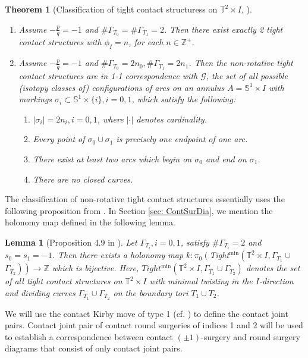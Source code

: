 \documentclass{amsart}
\theoremstyle{plain}
\newtheorem{thm}{Theorem}
\newtheorem{lem}{Lemma}
\theoremstyle{remark}
\theoremstyle{definition}
\newcommand{\s}{\mathbb{S}}
\begin{document}
\begin{thm}[Classification of tight contact structuress on $\mathbb{T}^2 \times I$, \cite{KH}]
\begin{enumerate}
\item Assume $-\frac{p}{q}=-1$ and $\# \Gamma_{T_0}=\# \Gamma_{T_1}=2$. Then there exist exactly 2 tight contact structures with $\phi_I=n$, for each $n \in \mathbb{Z}^{+}$.
    \item Assume $-\frac{p}{q}=-1$ and $\# \Gamma_{T_0}=2 n_0, \# \Gamma_{T_1}=2 n_1$. Then the non-rotative tight contact structures are in 1-1 correspondence with $\mathcal{G}$, the set of all possible (isotopy classes of) configurations of arcs on an annulus $A= \s^1 \times I$ with markings $\sigma_i \subset \s^1 \times\{i\}, i=0,1$, which satisfy the following:
    \begin{enumerate}
        \item  $\left|\sigma_i\right|=2 n_i, i=0,1$, where $|\cdot|$ denotes cardinality.
        \item  Every point of $\sigma_0 \cup \sigma_1$ is precisely one endpoint of one arc.
        \item There exist at least two arcs which begin on $\sigma_0$ and end on $\sigma_1$.
        \item There are no closed curves.
    \end{enumerate}
\end{enumerate}
\end{thm}

The classification of non-rotative tight contact structures essentially uses the following proposition from \cite{KH}.
In Section \ref{sec: ContSurDia}, we mention the holonomy map defined in the following lemma. 

\begin{lem}[Proposition 4.9 in \cite{KH}]\label{lem: NonRotTightContStr}
    Let $\Gamma_{T_i}, i=0,1$, satisfy $\# \Gamma_{T_i}=2$ and $s_0=s_1=-1$. 
    Then there exists a holonomy map $k: \pi_0\left(\right.$Tight$^{\min}\left(\mathbb{T}^2 \times I, \Gamma_{T_1} \cup\right.$ $\left.\left.\Gamma_{T_2}\right)\right) \rightarrow \mathbb{Z}$ which is bijective.
    Here, $Tight^{\min }\left(\mathbb{T}^2 \times I, \Gamma_{T_1} \cup \right.\left.\Gamma_{T_2}\right)$ denotes the set of all tight contact structures on $\mathbb{T}^2 \times I$ with minimal twisting in the $I$-direction and dividing curves $\Gamma_{T_1} \cup \Gamma_{T_2}$ on the boundary tori $T_1 \cup T_2$. 
\end{lem}

We will use the contact Kirby move of type 1 (cf. \cite{PD-CFKM}) to define the contact joint pairs. Contact joint pair of contact round surgeries of indices 1 and 2 will be used to establish a correspondence between contact $(\pm1)$-surgery and round surgery diagrams that consist of only contact joint pairs. 
\end{document}
